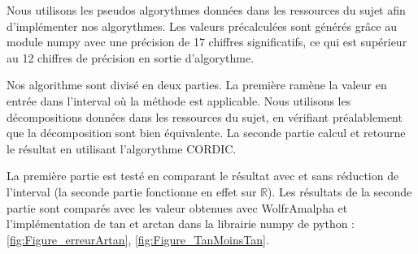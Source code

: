 \documentclass{article}
\begin{document}
Nous utilisons les pseudos algorythmes données dans les ressources du sujet afin d'implémenter nos algorythmes. Les valeurs précalculées sont générés grâce au module numpy avec une précision de 17 chiffres significatifs, ce qui est supérieur au 12 chiffres de précision en sortie d'algorythme.

Nos algorithme sont divisé en deux parties. La première ramène la valeur en entrée dans l'interval où la méthode est applicable. Nous utilisons les décompositions données dans les ressources du sujet, en vérifiant préalablement que la décomposition sont bien équivalente. La seconde partie calcul et retourne le résultat en utilisant l'algorythme CORDIC.

La première partie est testé en comparant le résultat avec et sans réduction de l'interval (la seconde partie fonctionne en effet sur $\mathbb{R}$). Les résultats de la seconde partie sont comparés avec les valeur  obtenues avec WolfrAmalpha et l'implémentation de tan et arctan dans la librairie numpy de python :
 \ref{fig:Figure_erreurArtan}, \ref{fig:Figure_TanMoinsTan}.
\end{document}

